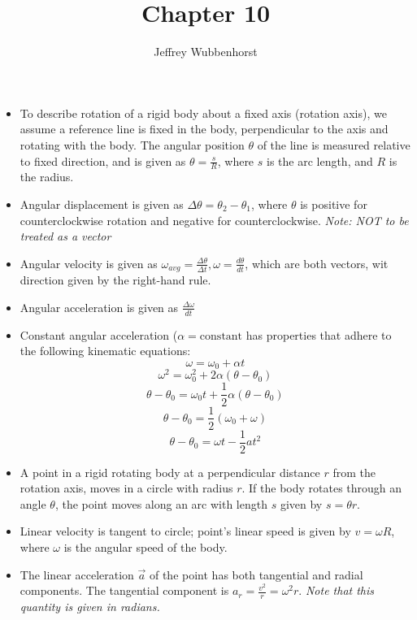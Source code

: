 \documentclass[10pt,letterpaper]{article}
\author{Jeffrey Wubbenhorst}
\title{Chapter 10}
\begin{document}
\maketitle

\begin{itemize}
\item To describe rotation of a rigid body about a fixed axis (rotation axis), we assume a reference line is fixed in the body, perpendicular to the axis and rotating with the body. The angular position $\theta$ of the line is measured relative to fixed direction, and is given as $\theta=\frac{s}{R}$, where $s$ is the arc length, and $R$ is the radius. 

\item Angular displacement is given as $\Delta\theta=\theta_2-\theta_1$, where $\theta$ is positive for counterclockwise rotation and negative for counterclockwise. \textit{Note: NOT to be treated as a vector}
\item Angular velocity is given as $\omega_{avg}=\frac{\Delta\theta}{\Delta t}, \omega=\frac{d\theta}{dt}$, which are both vectors, wit direction given by the right-hand rule. 
\item Angular acceleration is given as $\frac{\Delta\omega}{dt}$
\item Constant angular acceleration ($\alpha=\mbox{constant}$ has properties that adhere to the following kinematic equations: \\ 
$$\omega=\omega_0+\alpha t $$ 
$$ \omega^2=\omega_0^2+2\alpha(\theta-\theta_0) $$
$$ \theta-\theta_0=\omega_0 t+\frac{1}{2}\alpha(\theta-\theta_0) $$ 
$$ \theta-\theta_0=\frac{1}{2}(\omega_0+\omega )$$ 
$$\theta-\theta_0=\omega t-\frac{1}{2} at^2$$
\item A point in a rigid rotating body at a perpendicular distance $r$ from the rotation axis, moves in a circle with radius $r$. If the body rotates through an angle $\theta$, the point moves along an arc with length $s$ given by $s=\theta r$. 

\item Linear velocity is tangent to circle; point's linear speed is given by $v=\omega R$, where $\omega$ is the angular speed of the body.
\item The linear acceleration $\vec{a}$ of the point has both tangential and radial components. The tangential component is $a_r=\frac{v^2}{r}=\omega^2r$. \textit{Note that this quantity is given in radians.}


\end{itemize}
\end{document}
